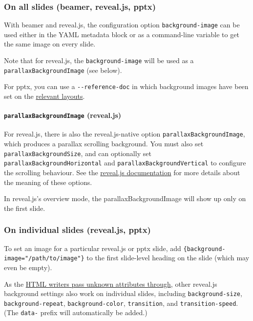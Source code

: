 \documentclass[
]{article}
\begin{document}
\hypertarget{on-all-slides-beamer-reveal.js-pptx}{%
\subsubsection{On all slides (beamer, reveal.js,
pptx)}\label{on-all-slides-beamer-reveal.js-pptx}}

With beamer and reveal.js, the configuration option
\texttt{background-image} can be used either in the YAML metadata block
or as a command-line variable to get the same image on every slide.

Note that for reveal.js, the \texttt{background-image} will be used as a
\texttt{parallaxBackgroundImage} (see below).

For pptx, you can use a \texttt{-\/-reference-doc} in which background
images have been set on the
\protect\hyperlink{powerpoint-layout-choice}{relevant layouts}.

\hypertarget{parallaxbackgroundimage-reveal.js}{%
\paragraph{\texorpdfstring{\texttt{parallaxBackgroundImage}
(reveal.js)}{parallaxBackgroundImage (reveal.js)}}\label{parallaxbackgroundimage-reveal.js}}

For reveal.js, there is also the reveal.js-native option
\texttt{parallaxBackgroundImage}, which produces a parallax scrolling
background. You must also set \texttt{parallaxBackgroundSize}, and can
optionally set \texttt{parallaxBackgroundHorizontal} and
\texttt{parallaxBackgroundVertical} to configure the scrolling
behaviour. See the
\href{https://revealjs.com/backgrounds/\#parallax-background}{reveal.js
documentation} for more details about the meaning of these options.

In reveal.js's overview mode, the parallaxBackgroundImage will show up
only on the first slide.

\hypertarget{on-individual-slides-reveal.js-pptx}{%
\subsubsection{On individual slides (reveal.js,
pptx)}\label{on-individual-slides-reveal.js-pptx}}

To set an image for a particular reveal.js or pptx slide, add
\texttt{\{background-image="/path/to/image"\}} to the first slide-level
heading on the slide (which may even be empty).

As the \protect\hyperlink{extension-link_attributes}{HTML writers pass
unknown attributes through}, other reveal.js background settings also
work on individual slides, including \texttt{background-size},
\texttt{background-repeat}, \texttt{background-color},
\texttt{transition}, and \texttt{transition-speed}. (The \texttt{data-}
prefix will automatically be added.)
\end{document}
